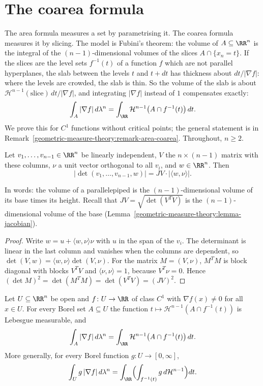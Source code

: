 \section{The coarea formula}\label{geometric-measure-theory:section-coarea}

The area formula measures a set by parametrising it. The coarea formula measures it by slicing. The model is Fubini's theorem: the volume of $A \subseteq \RR^n$ is the integral of the
$(n-1)$-dimensional volumes of the slices $A \cap \{x_n = t\}$. If the slices are the level sets $f^{-1}(t)$ of a function $f$ which are not parallel hyperplanes, the slab between the levels $t$ and
$t + dt$ has thickness about $dt/|\nabla f|$: where the levels are crowded, the slab is thin. So the volume of the slab is about $\mathcal{H}^{n-1}(\text{slice})\,dt/|\nabla f|$, and integrating
$|\nabla f|$ instead of $1$ compensates exactly:
\[
\int_A|\nabla f|\,d\lambda^n = \int_\RR\mathcal{H}^{n-1}\bigl(A \cap f^{-1}(t)\bigr)\,dt .
\]
We prove this for $C^1$ functions without critical points; the general statement is in Remark~\ref{geometric-measure-theory:remark-area-coarea}. Throughout, $n \geq 2$.

\begin{lemma}\label{geometric-measure-theory:lemma-normal-determinant}
Let $v_1, \ldots, v_{n-1} \in \RR^n$ be linearly independent, $V$ the $n \times (n - 1)$ matrix with these columns, $\nu$ a unit vector orthogonal to all $v_i$, and $w \in \RR^n$. Then
\[
|\det(v_1, \ldots, v_{n-1}, w)| = JV \cdot |\langle w, \nu\rangle| .
\]
\end{lemma}

In words: the volume of a parallelepiped is the $(n-1)$-dimensional volume of its base times its height. Recall that $JV = \sqrt{\det(V^TV)}$ is the $(n-1)$-dimensional volume of the
base (Lemma~\ref{geometric-measure-theory:lemma-jacobian}).

\begin{proof}
Write $w = u + \langle w, \nu\rangle\nu$ with $u$ in the span of the $v_i$. The determinant is linear in the last column and vanishes when the columns are dependent, so
$\det(V, w) = \langle w, \nu\rangle\det(V, \nu)$. For the matrix $M = (V, \nu)$, $M^TM$ is block diagonal with blocks $V^TV$ and $\langle\nu, \nu\rangle = 1$, because $V^T\nu = 0$. Hence
$(\det M)^2 = \det(M^TM) = \det(V^TV) = (JV)^2$.
\end{proof}

\begin{theorem}\label{geometric-measure-theory:theorem-coarea}
Let $U \subseteq \RR^n$ be open and $f \colon U \to \RR$ of class $C^1$ with $\nabla f(x) \neq 0$ for all $x \in U$. For every Borel set $A \subseteq U$ the function
$t \mapsto \mathcal{H}^{n-1}(A \cap f^{-1}(t))$ is Lebesgue measurable, and
\[
\int_A|\nabla f|\,d\lambda^n = \int_\RR\mathcal{H}^{n-1}\bigl(A \cap f^{-1}(t)\bigr)\,dt .
\]
More generally, for every Borel function $g \colon U \to [0, \infty]$,
\begin{equation}\label{geometric-measure-theory:equation-coarea}
\int_Ug\,|\nabla f|\,d\lambda^n = \int_\RR\Bigl(\int_{f^{-1}(t)}g\,d\mathcal{H}^{n-1}\Bigr)dt .
\end{equation}
\end{theorem}

